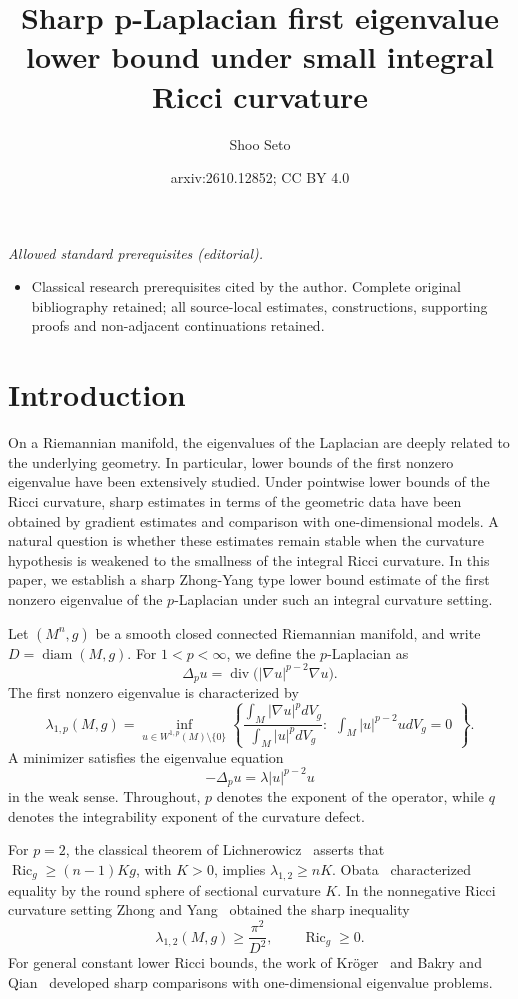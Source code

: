 \documentclass[11pt]{amsart}
\title{Sharp p-Laplacian first eigenvalue lower bound under small integral Ricci curvature}
\author{Shoo Seto}
\date{arxiv:2610.12852; CC BY 4.0}
\DeclareMathOperator{\Ric}{Ric}
\DeclareMathOperator{\diam}{diam}
\DeclareMathOperator{\diver}{div}
\theoremstyle{definition}
\begin{document}
\maketitle
\noindent\textit{Allowed standard prerequisites (editorial).}\begin{itemize}
\item Classical research prerequisites cited by the author. Complete original bibliography retained; all source-local estimates, constructions, supporting proofs and non-adjacent continuations retained.
\end{itemize}\medskip
\section{Introduction}
On a Riemannian manifold, the eigenvalues of the Laplacian are deeply related to the underlying geometry.  In particular, lower bounds of the first nonzero eigenvalue have been extensively studied.  Under pointwise lower bounds of the Ricci curvature, sharp estimates in terms of the geometric data have been obtained by gradient estimates and comparison with one-dimensional models. A natural question is whether these estimates remain stable when the curvature hypothesis is weakened to the smallness of the integral Ricci curvature. In this paper, we establish a sharp Zhong-Yang type lower bound estimate of the first nonzero eigenvalue of the $p$-Laplacian under such an integral curvature setting.

Let $(M^n,g)$ be a smooth closed connected Riemannian manifold, and write $D=\diam(M,g)$. For $1<p<\infty$, we define the $p$-Laplacian as
\[
  \Delta_p u=\diver\bigl(|\nabla u|^{p-2}\nabla u\bigr).
\]
The first nonzero eigenvalue is characterized by
\begin{equation}\label{eq:variational}
 \lambda_{1,p}(M,g)=
 \inf_{u\in W^{1,p}(M)\setminus\{0\}}\left\{
 \frac{\int_M|\nabla u|^p dV_g}{\int_M|u|^pd V_g}:
 \begin{array}{l}
 \int_M|u|^{p-2}u d V_g=0
 \end{array}\right\}.
\end{equation}
A minimizer satisfies the eigenvalue equation
\begin{equation}\label{plaplaceeigen}
    -\Delta_pu=\lambda|u|^{p-2}u
\end{equation}in the weak sense. Throughout, $p$ denotes the exponent of the operator, while $q$ denotes the integrability exponent of the curvature defect.

For $p=2$, the classical theorem of Lichnerowicz~\cite{Lichnerowicz1958} asserts that $\Ric_g\ge(n-1)Kg$, with $K>0$, implies $\lambda_{1,2}\ge nK$. Obata~\cite{Obata1962} characterized equality by the round sphere of sectional curvature $K$. In the nonnegative Ricci curvature setting Zhong and Yang~\cite{ZhongYang1984} obtained the sharp inequality
\begin{equation}\label{eq:ZY}
 \lambda_{1,2}(M,g)\ge\frac{\pi^2}{D^2},
 \qquad \Ric_g\ge0.
\end{equation}
For general constant lower Ricci bounds, the work of Kr\"oger~\cite{Kroger1992} and Bakry and Qian~\cite{BakryQian2000} developed sharp comparisons with one-dimensional eigenvalue problems.
\end{document}
